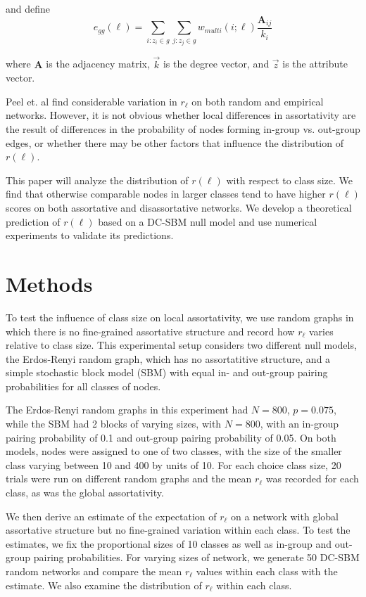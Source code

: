 \documentclass[12pt]{article}
\begin{document}
and define
\begin{equation}
  e_{gg}(\ell) = \sum_{i: z_i \in g} \sum_{j: z_j \in g} w_{multi}(i; \ell) \frac{\mathbf{A}_{ij}}{k_i}
\end{equation} \cite{Peel:2018}

where $\mathbf{A}$ is the adjacency matrix, $\vec{k}$ is the degree vector, and $\vec{z}$ is the attribute vector.

Peel et. al find considerable variation in $r_\ell$ on both random and empirical networks.  However, it is not obvious whether local differences in assortativity are the result of differences in the probability of nodes forming in-group vs. out-group edges, or whether there may be other factors that influence the distribution of $r(\ell)$.

This paper will analyze the distribution of $r(\ell)$ with respect to class size.  We find that otherwise comparable nodes in larger classes tend to have higher $r(\ell)$ scores on both assortative and disassortative networks.  We develop a theoretical prediction of $r(\ell)$ based on a DC-SBM null model and use numerical experiments to validate its predictions.

\section{Methods}
To test the influence of class size on local assortativity, we use random graphs in which there is no fine-grained assortative structure and record how $r_\ell$ varies relative to class size.  This experimental setup considers two different null models, the Erdos-Renyi random graph, which has no assortatitive structure, and a simple stochastic block model (SBM) with equal in- and out-group pairing probabilities for all classes of nodes.

The Erdos-Renyi random graphs in this experiment had $N=800$, $p=0.075$, while the SBM had 2 blocks of varying sizes, with $N=800$, with an in-group pairing probability of 0.1 and out-group pairing probability of 0.05.  On both models, nodes were assigned to one of two classes, with the size of the smaller class varying between 10 and 400 by units of 10.  For each choice class size, 20 trials were run on different random graphs and the mean $r_\ell$ was recorded for each class, as was the global assortativity.

We then derive an estimate of the expectation of $r_\ell$ on a network with global assortative structure but no fine-grained variation within each class.  To test the estimates, we fix the proportional sizes of 10 classes as well as in-group and out-group pairing probabilities.  For varying sizes of network, we generate 50 DC-SBM random networks and compare the mean $r_\ell$ values within each class with the estimate.  We also examine the distribution of $r_\ell$ within each class.  
\end{document}
